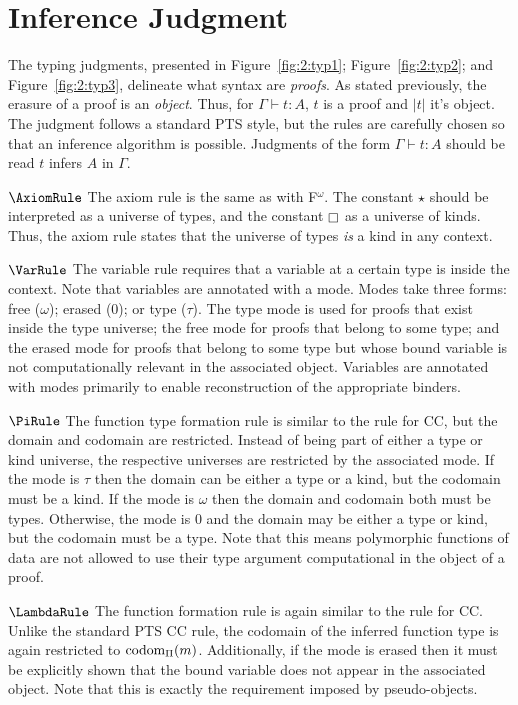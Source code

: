 \section{Inference Judgment}
\label{sec:2:judgments}


The typing judgments, presented in Figure~\ref{fig:2:typ1}; Figure~\ref{fig:2:typ2}; and Figure~\ref{fig:2:typ3}, delineate what syntax are \textit{proofs}.
As stated previously, the erasure of a proof is an \textit{object}.
Thus, for $\Gamma \vdash t : A$, $t$ is a proof and $|t|$ it's object.
The judgment follows a standard PTS style, but the rules are carefully chosen so that an inference algorithm is possible.
Judgments of the form $\Gamma \vdash t : A$ should be read $t$ infers $A$ in $\Gamma$.

$\AxiomRule$ The axiom rule is the same as with F$^\omega$.
The constant $\star$ should be interpreted as a universe of types, and the constant $\kind$ as a universe of kinds.
Thus, the axiom rule states that the universe of types \textit{is} a kind in any context.

$\VarRule$ The variable rule requires that a variable at a certain type is inside the context.
Note that variables are annotated with a mode.
Modes take three forms: free ($\omega$); erased ($0$); or type ($\tau$).
The type mode is used for proofs that exist inside the type universe; the free mode for proofs that belong to some type; and the erased mode for proofs that belong to some type but whose bound variable is not computationally relevant in the associated object.
Variables are annotated with modes primarily to enable reconstruction of the appropriate binders.




$\PiRule$ The function type formation rule is similar to the rule for CC, but the domain and codomain are restricted.
Instead of being part of either a type or kind universe, the respective universes are restricted by the associated mode.
If the mode is $\tau$ then the domain can be either a type or a kind, but the codomain must be a kind.
If the mode is $\omega$ then the domain and codomain both must be types.
Otherwise, the mode is $0$ and the domain may be either a type or kind, but the codomain must be a type.
Note that this means polymorphic functions of data are not allowed to use their type argument computational in the object of a proof.

$\LambdaRule$ The function formation rule is again similar to the rule for CC.
Unlike the standard PTS CC rule, the codomain of the inferred function type is again restricted to $\mbox{\normalfont codom}_\Pi(m)$.
Additionally, if the mode is erased then it must be explicitly shown that the bound variable does not appear in the associated object.
Note that this is exactly the requirement imposed by pseudo-objects.

